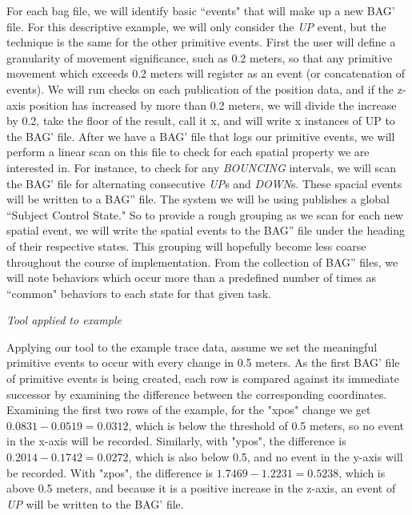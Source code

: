 For each bag file, we will identify basic ``events" that will make up a new BAG' file.  
For this descriptive example, we will only consider the \emph{UP} event, but the technique is the same for the other primitive events.  
First the user will define a granularity of movement significance, such as 0.2 meters, so that any primitive movement which exceeds 0.2 meters will register as an event (or concatenation of events).
We will run checks on each publication of the position data, and if the z-axis position has increased by more than 0.2 meters, we will divide the increase by 0.2, take the floor of the result, call it x, and will write x instances of UP to the BAG' file.  
After we have a BAG' file that logs our primitive events, we will perform a linear scan on this file to check for each spatial property we are interested in.  
For instance, to check for any \emph{BOUNCING} intervals, we will scan the BAG' file for alternating consecutive \emph{UP}s and \emph{DOWN}s. 
These spacial events will be written to a BAG'' file.
The system we will be using publishes a global ``Subject Control State."
So to provide a rough grouping as we scan for each new spatial event, we will write the spatial events to the BAG'' file under the heading of their respective states.
This grouping will hopefully become less coarse throughout the course of implementation.
From the collection of BAG'' files, we will note behaviors which occur more than a predefined number of times as ``common" behaviors to each state for that given task.

\emph{Tool applied to example}


Applying our tool to the example trace data, assume we set the meaningful primitive events to occur with every change in 0.5 meters. 
As the first BAG' file of primitive events is being created, each row is compared against its immediate successor by examining the difference between the corresponding coordinates.
Examining the first two rows of the example, for the "xpos" change we get $0.0831-0.0519=0.0312$, which is below the threshold of 0.5 meters, so no event in the x-axis will be recorded.  
Similarly, with "ypos", the difference is $0.2014-0.1742=0.0272$, which is also below 0.5, and no event in the y-axis will be recorded.
With "zpos", the difference is $1.7469-1.2231=0.5238$, which is above 0.5 meters, and because it is a positive increase in the z-axis, an event of \emph{UP} will be written to the BAG' file.

